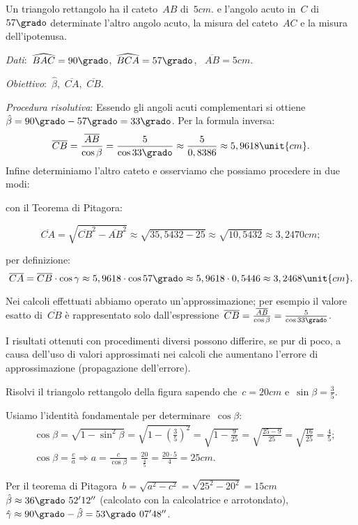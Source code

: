  \begin{esempio}
Un triangolo rettangolo ha il cateto~$AB$ di~$5\unit{cm}$. e l'angolo acuto 
in~$C$ di~$57\grado$ determinate l'altro angolo acuto,
la misura del cateto~$AC$ e la misura dell'ipotenusa.

\emph{Dati}:~$\widehat{BAC}=90\grado$,\quad~$\widehat{BCA}=57\grado$,
\quad~$\overline{AB}=5\unit{cm}$.

\emph{Obiettivo}:~$\hat{\beta}$,\quad~$\overline{CA}$,\quad~$\overline{CB}$.

\emph{Procedura risolutiva}:
Essendo gli angoli acuti complementari si 
ottiene~$\hat{\beta}=90\grado-57\grado=33\grado$.
Per la formula inversa:
\[\overline{CB}=\frac{\overline{AB}}{\cos 
\beta}=\frac{5}{\cos 33\grado} \approx\frac{5}{0,8386}\approx5,9618\unit{cm}.\]
Infine determiniamo l'altro cateto e osserviamo che possiamo procedere in due 
modi:
\begin{itemize*}
 \item con il Teorema di Pitagora:
 
\[\overline{CA}=\sqrt{\overline{CB}^{2}-\overline{AB}^{2}}\approx\sqrt{35,
5432-25}\approx\sqrt{10,5432}\approx3,2470\unit{cm};\]
 \item per definizione:
 \[\overline{CA}=\overline{CB}\cdot \cos \gamma\approx5,9618 \cdot 
\cos 57\grado \approx5,9618\cdot 0,5446\approx3,2468\unit{cm}.\]
\end{itemize*}
\osservazione
\begin{enumeratea}
\item Nei calcoli effettuati abbiamo operato un'approssimazione; per esempio il 
valore esatto di~$\overline{CB}$ è rappresentato solo
dall'espressione~$\overline{CB}=\frac{\overline{AB}}{\cos 
\beta}=\frac{5}{\cos 33\grado}$.
\item I risultati ottenuti con procedimenti diversi possono differire, se pur 
di 
poco, a causa dell'uso di valori approssimati
nei calcoli che aumentano l'errore di approssimazione (propagazione 
dell'errore).
\end{enumeratea}
 \end{esempio}

 \begin{esempio}
Risolvi il triangolo rettangolo della figura sapendo che~$c=20\unit{cm}$ 
e~$\sin 
\beta=\frac{3}{5}$.
\begin{center}
 
\end{center}
Usiamo l'identità fondamentale per determinare~$\cos \beta$:
\begin{align*}
&\cos \beta=\sqrt{1-\sin^{2} 
\beta}=\sqrt{1-\left(\frac{3}{5}\right)^{2}}=\sqrt{1-\frac{9}{25}}=
    \sqrt{\frac{25-9}{25}}=\sqrt{\frac{16}{25}}=\frac{4}{5};\\
&\cos \beta=\frac{c}{a}\Rightarrow a=\frac{c}{\cos \beta} = 
\frac{20}{\frac{4}{5}}=\frac{20\cdot{5}}{4}=25\unit{cm}.
\end{align*}

Per il teorema di 
Pitagora~$b=\sqrt{a^{2}-c^{2}}=\sqrt{25^{2}-20^{2}}=15\unit{cm}$
$\hat{\beta}\approx36\grado~52' 12''$ (calcolato con la calcolatrice e 
arrotondato), $\hat{\gamma}\approx90\grado - \hat{\beta} = 53\grado~07'48''$.
 \end{esempio}


